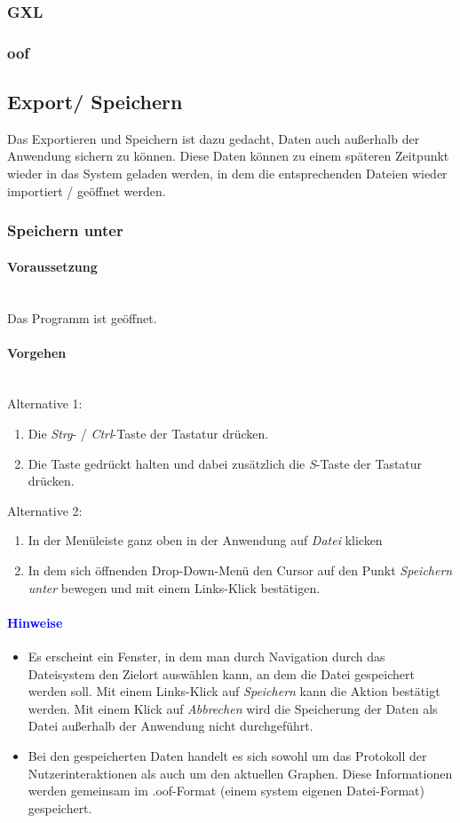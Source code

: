 \documentclass[enabledeprecatedfontcommands,fontsize=11pt,paper=a4,twoside]{scrartcl}
\newcounter{one}
\newcommand*{\hint}{\paragraph{\textcolor{blue}{Hinweise}}}
\newcommand*{\condition}{\paragraph{Voraussetzung}$\;$ \vspace{0.2cm}\\}
\newcommand*{\actions}{\paragraph{Vorgehen} $\;$\vspace{0.2cm}\\}
\begin{document}
							\newpage
		\subsubsection{GXL}
		
							\newpage
		\subsubsection{oof}
		
		
							\newpage
	\subsection{Export/ Speichern} \label{export}
Das Exportieren und Speichern ist dazu gedacht, Daten auch außerhalb der Anwendung sichern zu können. Diese Daten können zu einem späteren Zeitpunkt wieder in das System geladen werden, in dem die entsprechenden Dateien wieder importiert / geöffnet werden. 
	
	
		\subsubsection{Speichern unter}
		\condition 	
		Das Programm ist geöffnet.
		\actions
		Alternative 1:
		\begin{enumerate}
				\item Die \textit{Strg}- / \textit{Ctrl}-Taste der Tastatur drücken.
				\item Die Taste gedrückt halten und dabei zusätzlich die \textit{S}-Taste der Tastatur drücken.
		\end{enumerate}				
		Alternative 2:
		\begin{enumerate}
				\item In der Menüleiste ganz oben in der Anwendung auf \textit{Datei} klicken 
				\item In dem sich öffnenden Drop-Down-Menü den Cursor auf den Punkt \textit{Speichern unter} bewegen und mit einem Links-Klick bestätigen.
		\end{enumerate}		
		\hint
		\begin{itemize}
				\item Es erscheint ein Fenster, in dem man durch Navigation durch das Dateisystem den Zielort auswählen kann, an dem die Datei gespeichert werden soll. Mit einem Links-Klick auf \textit{Speichern} kann die Aktion bestätigt werden. Mit einem Klick auf \textit{Abbrechen} wird die Speicherung der Daten als Datei außerhalb der Anwendung nicht durchgeführt.
				\item Bei den gespeicherten Daten handelt es sich sowohl um das Protokoll der Nutzerinteraktionen als auch um den aktuellen Graphen. Diese Informationen werden gemeinsam im .oof-Format (einem system eigenen Datei-Format) gespeichert.
		\end{itemize}
		
\end{document}
